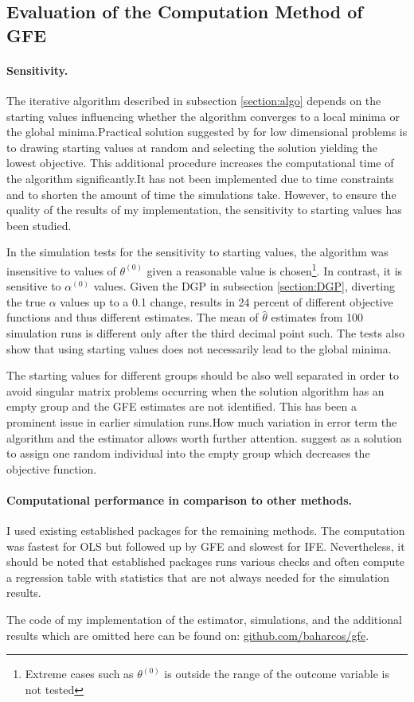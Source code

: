 \subsection{Evaluation of the Computation Method of GFE} \label{section:sensitivity}
\paragraph{Sensitivity.} The iterative algorithm described in subsection \ref{section:algo} depends on the starting values influencing whether the algorithm converges to a local minima or the global minima.Practical solution suggested by \textcite{bonhomme2015grouped} for low dimensional problems is to drawing starting values at random and selecting the solution yielding the lowest objective. This additional procedure increases the computational time of the algorithm significantly.It has not been implemented due to time constraints and to shorten the amount of time the simulations take. However, to ensure the quality of the results of my implementation, the sensitivity to starting values has been studied.

In the simulation tests for the sensitivity to starting values, the algorithm was insensitive to values of $\theta^{(0)}$ given a reasonable value is chosen\footnote{Extreme cases such as $\theta^{(0)}$ is outside the range of the outcome variable is not tested}. In contrast, it is sensitive to $\alpha^{(0)}$ values. 
Given the DGP in subsection \ref{section:DGP}, diverting the true $\alpha$ values up to a 0.1 change, results in 24 percent of different objective functions and thus different estimates. The mean of $\hat{\theta}$ estimates from 100 simulation runs is different only after the third decimal point such. The tests also show that using starting values does not necessarily lead to the global minima.  

The starting values for different groups should be also well separated in order to avoid singular matrix problems occurring when the solution algorithm has an empty group and the GFE estimates are not identified. This has been a prominent issue in earlier simulation runs.How much variation in error term the algorithm and the estimator allows worth further attention. \textcite{bonhomme2015grouped} suggest as a solution to assign one random individual into the empty group which decreases the objective function.

\paragraph{Computational performance in comparison to other methods.}
I used existing established packages for the remaining methods. The computation was fastest for OLS but followed up by GFE and slowest for IFE. Nevertheless, it should be noted that established packages runs various checks and often compute a regression table with statistics that are not always needed for the simulation results. 

The code of my implementation of the estimator, simulations, and the additional results which are omitted here can be found on: \href{https://github.com/baharcos/gfe.}{github.com/baharcos/gfe}.
